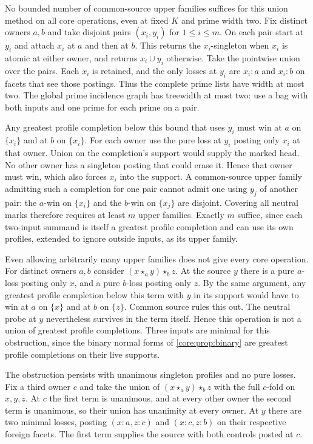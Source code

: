 No bounded number of common-source upper families
suffices for this union method on all core operations,
even at fixed $K$ and prime width two. Fix distinct
owners $a,b$ and take disjoint pairs $(x_i,y_i)$ for
$1\le i\le m$. On each pair start at $y_i$ and attach
$x_i$ at $a$ and then at $b$. This returns the
$x_i$-singleton when $x_i$ is atomic at either
owner, and returns $x_i\cup y_i$ otherwise.
Take the pointwise union over the pairs.
Each $x_i$ is retained, and the only losses at
$y_i$ are $x_i:a$ and $x_i:b$ on facets that
see those postings. Thus the complete prime lists
have width at most two.
The global prime incidence graph has treewidth at
most two: use a bag with both inputs and one prime
for each prime on a pair.

Any greatest profile completion below this bound
that uses $y_i$ must win at $a$ on $\{x_i\}$ and
at $b$ on $\{x_i\}$. For each owner use the pure
loss at $y_i$ posting only $x_i$ at that owner.
Union on the completion's support would supply the
marked head. No other owner has a singleton posting
that could erase it. Hence that owner must win, which
also forces $x_i$ into the support. A common-source
upper family admitting such a completion for one
pair cannot admit one using $y_j$ of another pair:
the $a$-win on $\{x_i\}$ and the $b$-win on
$\{x_j\}$ are disjoint. Covering all neutral marks
therefore requires at least $m$ upper families.
Exactly $m$ suffice, since each two-input summand is
itself a greatest profile completion and can use
its own profiles, extended to ignore outside
inputs, as its upper family.

Even allowing arbitrarily many upper families does not
give every core operation. For distinct owners $a,b$
consider $(x\star_a y)\star_b z$. At the source $y$
there is a pure $a$-loss posting only $x$, and a pure
$b$-loss posting only $z$. By the same argument, any
greatest profile completion below this term with $y$
in its support would have to win at $a$ on $\{x\}$
and at $b$ on $\{z\}$. Common source rules this out.
The neutral probe at $y$ nevertheless survives in
the term itself. Hence this operation is not a union
of greatest profile completions. Three inputs are
minimal for this obstruction, since the binary
normal forms of \cref{core:prop:binary} are greatest
profile completions on their live supports.

The obstruction persists with unanimous singleton profiles
and no pure losses. Fix a third owner $c$ and take the union
of $(x\star_a y)\star_b z$ with the full $c$-fold on $x,y,z$.
At $c$ the first term is unanimous, and at every other
owner the second term is unanimous, so their union has
unanimity at every owner. At $y$ there are two minimal
losses, posting $(x:a,z:c)$ and $(x:c,z:b)$ on their
respective foreign facets. The first term supplies
the source with both controls posted at $c$.

